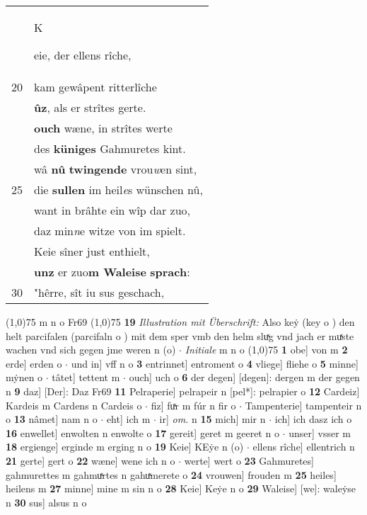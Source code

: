 \documentclass[8pt,a4paper,notitlepage]{article}
\begin{document}
\begin{table}[ht]
\begin{minipage}[t]{0.5\linewidth}
\begin{tabular}{rl}
 & \begin{large}K\end{large}eie, der ellens rîche,\\ 
20 & kam gewâpent ritterlîche\\ 
 & \textbf{ûz}, als er strîtes gerte.\\ 
 & \textbf{ouch} wæne, in strîtes werte\\ 
 & des \textbf{küniges} Gahmuretes kint.\\ 
 & wâ \textbf{nû} \textbf{twingende} vrou\textit{w}en sint,\\ 
25 & die \textbf{sullen} im heil\textit{e}s wünschen nû,\\ 
 & want in brâhte ein wîp dar zuo,\\ 
 & daz min\textit{n}e witze von im spielt.\\ 
 & Keie sîner just enthielt,\\ 
 & \textbf{unz} er zuo\textbf{m Waleise} \textbf{sprach}:\\ 
30 & "hêrre, sît iu sus geschach,\\ 
\end{tabular}
\scriptsize
\line(1,0){75} \newline
m n o Fr69 \newline
\line(1,0){75} \newline
\textbf{19} \textit{Illustration mit Überschrift:} Also keẏ (key o  ) den helt parcifalen (parcifaln o  ) mit dem sper vmb den helm sluͯg vnd jach er muͯste wachen vnd sich gegen jme weren n (o)   $\cdot$ \textit{Initiale} m n o  \newline
\line(1,0){75} \newline
\textbf{1} obe] von m \textbf{2} erde] erden o  $\cdot$ und in] vff n o \textbf{3} entrinnet] entroment o \textbf{4} vliege] fliehe o \textbf{5} minne] mẏnen o  $\cdot$ tâtet] tettent m  $\cdot$ ouch] uch o \textbf{6} der degen] [degen]: dergen m der gegen n \textbf{9} daz] [Der]: Daz Fr69 \textbf{11} Pelraperie] pelrapeir n [pel*]: pelrapier o \textbf{12} Cardeiz] Kardeis m Cardens n Cardeis o  $\cdot$ fiz] fuͯr m fúr n fir o  $\cdot$ Tampenterie] tampenteir n o \textbf{13} nâmet] nam n o  $\cdot$ eht] ich m  $\cdot$ ir] \textit{om.} n \textbf{15} mich] mir n  $\cdot$ ich] ich dasz ich o \textbf{16} enwellet] enwolten n enwolte o \textbf{17} gereit] geret m geeret n o  $\cdot$ unser] vsser m \textbf{18} ergienge] erginde m erging n o \textbf{19} Keie] KEẏe n (o)  $\cdot$ ellens rîche] ellentrich n \textbf{21} gerte] gert o \textbf{22} wæne] wene ich n o  $\cdot$ werte] wert o \textbf{23} Gahmuretes] gahmurettes m gahmuͯrtes n gahuͯmerete o \textbf{24} vrouwen] frouden m \textbf{25} heiles] heilens m \textbf{27} minne] mine m sin n o \textbf{28} Keie] Keẏe n o \textbf{29} Waleise] [we]: waleẏse n \textbf{30} sus] alsus n o \newline
\end{minipage}
\end{table}
\end{document}
